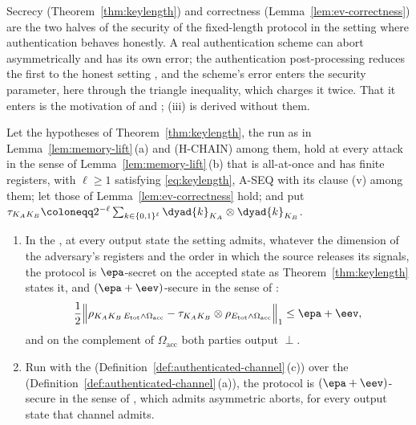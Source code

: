 Secrecy (Theorem~\ref{thm:keylength}) and correctness
(Lemma~\ref{lem:ev-correctness}) are the two halves of the security of the
fixed-length protocol in the setting where authentication behaves honestly.
A real authentication scheme can abort asymmetrically and has its own error;
the authentication post-processing reduces the first to the honest setting
\cite[Sec.~5, Thm.~5.1]{tupkary2026decoy}, and the scheme's error enters the
security parameter, here through the triangle inequality, which charges it
twice. That it enters is the motivation of
\cite[Sec.~4, footnote~8]{tupkary2026decoy} and
\cite[Sec.~5.6.1]{tupkary2025survey}; (iii) is derived without them.

\begin{corollary}\label{cor:composed-security}
Let the hypotheses of Theorem~\ref{thm:keylength}, the run as in
Lemma~\ref{lem:memory-lift}\,(a) and (H-CHAIN) among them, hold at every
attack in the sense of Lemma~\ref{lem:memory-lift}\,(b) that is all-at-once
and has finite registers, with $\ell\ge1$ satisfying \eqref{eq:keylength},
A-SEQ with its clause (v) among them; let those of
Lemma~\ref{lem:ev-correctness} hold; and put
$\tau_{K_AK_B}\coloneqq2^{-\ell}\sum_{k\in\{0,1\}^{\ell}}
\dyad{k}_{K_A}\otimes\dyad{k}_{K_B}$.
\begin{enumerate}[label=(\roman*),leftmargin=2.4em]
\item In the , at every output state the
  setting admits, whatever the dimension of the adversary's registers and the
  order in which the source releases its signals, the protocol is
  $\epa$-secret on the accepted state as Theorem~\ref{thm:keylength} states
  it, and $(\epa+\eev)$-secure in the sense of
  \cite[Sec.~2.3, Def.~2.1, Eq.~(1)]{tupkary2025survey}:
  \begin{equation}\label{eq:composed-honest}
    \frac12\Big\|\rho_{K_AK_B\,E_{\mathrm{tot}}\wedge\Omega_{\mathrm{acc}}}
    -\tau_{K_AK_B}\otimes
    \rho_{E_{\mathrm{tot}}\wedge\Omega_{\mathrm{acc}}}\Big\|_1
    \le\epa+\eev ,
  \end{equation}
  and on the complement of $\Omega_{\mathrm{acc}}$ both parties output
  $\perp$.
\item Run with the 
  (Definition~\ref{def:authenticated-channel}\,(c)) over the
  (Definition~\ref{def:authenticated-channel}\,(a)), the protocol is
  $(\epa+\eev)$-secure in the sense of
  \cite[Sec.~3.3, Def.~3.8]{tupkary2026decoy}, which admits asymmetric
  aborts, for every output state that channel admits.

\end{enumerate}
\end{corollary}
